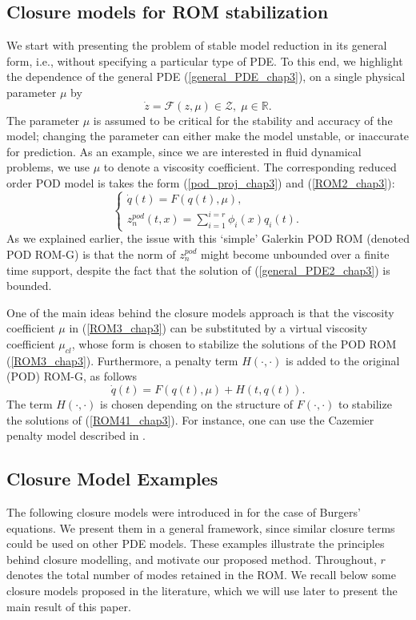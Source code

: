 \documentclass[letterpaper,conference,onecolumn,11pt]{IEEEtran}
\begin{document}
\subsection{Closure models for ROM stabilization}\label{closure_models_Chap3}  We start with presenting the problem of stable model reduction in its general form, i.e., without specifying a
particular type of PDE. To this end, we highlight the dependence
of the general PDE  (\ref{general_PDE_chap3}), on a single
physical parameter $\mu$ by
\begin{equation}\label{general_PDE2_chap3}
\dot{z} = \mathcal{F}(z,\mu) \in\mathcal{Z},\;\mu\in\mathbb{R}.
\end{equation}
The parameter $\mu$ is assumed to be critical for the stability and
accuracy of the model; changing the parameter can either make the
model unstable, or inaccurate for prediction. As an example, since we
are interested in fluid dynamical problems, we use $\mu$ to denote a
viscosity coefficient. The corresponding reduced order POD model is
takes the form (\ref{pod_proj_chap3}) and (\ref{ROM2_chap3}):
\begin{equation}\label{ROM3_chap3}
\left\{\begin{array}{l} \dot{q}(t) =F(q(t),\mu),\\
z_n^{pod}(t,x)=\sum_{i=1}^{i=r}\phi_{i}(x)q_{i}(t).
\end{array}\right .
\end{equation}
As we explained earlier, the issue with this `simple' Galerkin POD ROM
(denoted POD ROM-G) is that the norm of $z_n^{pod}$ might become
unbounded over a finite time support, despite the fact that the
solution of (\ref{general_PDE2_chap3}) is bounded.

One of the main ideas behind the closure models approach is that the
viscosity coefficient $\mu$ in (\ref{ROM3_chap3}) can be substituted
by a virtual viscosity coefficient $\mu_{cl}$, whose form is chosen to
stabilize the solutions of the POD ROM
(\ref{ROM3_chap3}). Furthermore, a penalty term $H(\cdot,\cdot)$ is
added to the original (POD) ROM-G, as follows
\begin{equation}\label{ROM41_chap3}
\dot{q}(t) =F(q(t),\mu)+H(t,q(t)).
\end{equation}
The term $H(\cdot,\cdot)$ is chosen depending on the structure of
$F(\cdot,\cdot)$ to stabilize the solutions of
(\ref{ROM41_chap3}). For instance, one can use the Cazemier penalty
model described in \cite{SI13}.

\subsection{Closure Model Examples}
The following closure models were introduced in \cite{WABI12,SI13}
for the case of Burgers' equations. We present them in a general
framework, since similar closure terms could be used on other PDE
models. These examples illustrate the principles behind closure
modelling, and motivate our proposed method. Throughout, $r$
denotes the total number of modes retained in the ROM. We recall
below some closure models proposed in the literature, which we
will use later to present the main result of this paper.
\end{document}
